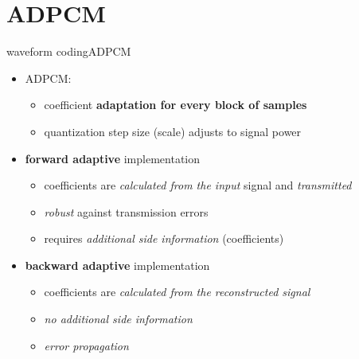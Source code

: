     \section{ADPCM}
	\begin{frame}{waveform coding}{ADPCM}
        \begin{itemize}
            \item   ADPCM:
                \begin{itemize}
                    \item coefficient \textbf{adaptation for every block of samples}
                    \item   quantization step size (scale) adjusts to signal power
                \end{itemize}
            \bigskip
            \item<2->   \textbf{forward adaptive} implementation
                \begin{itemize}
                    \item   coefficients are \textit{calculated from the input} signal and \textit{transmitted}
                    \item   \textit{robust} against transmission errors 
                    \item   requires \textit{additional side information} (coefficients)
                \end{itemize}
            \bigskip
            \item<3->   \textbf{backward adaptive} implementation
                \begin{itemize}
                    \item   coefficients are \textit{calculated from the reconstructed signal} 
                    \item   \textit{no additional side information}
                    \item   \textit{error propagation}
                \end{itemize}
        \end{itemize}
	\end{frame}
	
